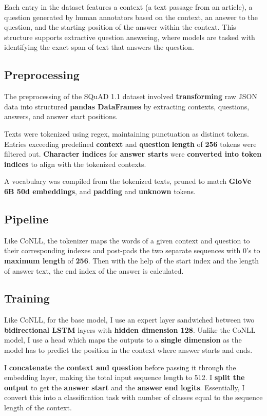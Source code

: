 \documentclass[12pt]{article}
\begin{document}
Each entry in the dataset features a context (a text passage from an article), a question generated by human annotators based on the context, an answer to the question, and the starting position of the answer within the context. This structure supports extractive question answering, where models are tasked with identifying the exact span of text that answers the question.

\subsection{Preprocessing}
The preprocessing of the SQuAD 1.1 dataset involved \textbf{transforming} raw JSON data into structured \textbf{pandas DataFrames} by extracting contexts, questions, answers, and answer start positions. 

Texts were tokenized using regex, maintaining punctuation as distinct tokens. Entries exceeding predefined \textbf{context} and \textbf{question} \textbf{length} of \textbf{256} tokens were filtered out. \textbf{Character indices} for \textbf{answer starts} were \textbf{converted into token indices} to align with the tokenized contexts. 

A vocabulary was compiled from the tokenized texts, pruned to match \textbf{GloVe 6B 50d embeddings}, and \textbf{padding} and \textbf{unknown} tokens. 

\subsection{Pipeline}
Like CoNLL, the tokenizer maps the words of a given context and question to their corresponding indexes and post-pads the two separate sequences with 0's to \textbf{maximum length} of \textbf{256}. Then with the help of the start index and the length of answer text, the end index of the answer is calculated.

\subsection{Training}
Like CoNLL, for the base model, I use an expert layer sandwiched between two \textbf{bidirectional LSTM} layers with \textbf{hidden dimension 128}. Unlike the CoNLL model, I use a head which maps the outputs to a \textbf{single dimension} as the model has to predict the position in the context where answer starts and ends. 

I \textbf{concatenate} the \textbf{context and question} before passing it through the embedding layer, making the total input sequence length to 512. I \textbf{split the output} to get the \textbf{answer start} and the \textbf{answer end logits}. Essentially, I convert this into a classification task with number of classes equal to the sequence length of the context.
\end{document}
